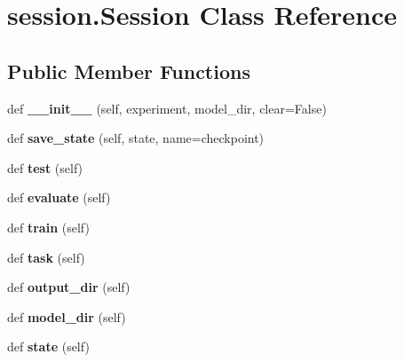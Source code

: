 \hypertarget{classsession_1_1Session}{}\section{session.\+Session Class Reference}
\label{classsession_1_1Session}
\subsection*{Public Member Functions}
\begin{DoxyCompactItemize}
\item 
def {\bfseries \+\_\+\+\_\+init\+\_\+\+\_\+} (self, experiment, model\+\_\+dir, clear=False)\hypertarget{classsession_1_1Session_a79087a984df38aaaed52c9cee494c388}{}\label{classsession_1_1Session_a79087a984df38aaaed52c9cee494c388}

\item 
def {\bfseries save\+\_\+state} (self, state, name=\textquotesingle{}checkpoint\textquotesingle{})\hypertarget{classsession_1_1Session_abafdc85b828e5a4494a88ea434a025f2}{}\label{classsession_1_1Session_abafdc85b828e5a4494a88ea434a025f2}

\item 
def {\bfseries test} (self)\hypertarget{classsession_1_1Session_a3ef92529bd7fc0fef4cb0fd1c83a4672}{}\label{classsession_1_1Session_a3ef92529bd7fc0fef4cb0fd1c83a4672}

\item 
def {\bfseries evaluate} (self)\hypertarget{classsession_1_1Session_a8078541c3b0abd31023b219869556066}{}\label{classsession_1_1Session_a8078541c3b0abd31023b219869556066}

\item 
def {\bfseries train} (self)\hypertarget{classsession_1_1Session_a6cbb164424cf705c4d0a86fd543310c9}{}\label{classsession_1_1Session_a6cbb164424cf705c4d0a86fd543310c9}

\item 
def {\bfseries task} (self)\hypertarget{classsession_1_1Session_aca12e663d21e88ebabf095ffe079f0a1}{}\label{classsession_1_1Session_aca12e663d21e88ebabf095ffe079f0a1}

\item 
def {\bfseries output\+\_\+dir} (self)\hypertarget{classsession_1_1Session_a9310df9e8c31a4c7fd3aef3625a16b86}{}\label{classsession_1_1Session_a9310df9e8c31a4c7fd3aef3625a16b86}

\item 
def {\bfseries model\+\_\+dir} (self)\hypertarget{classsession_1_1Session_a2ae79f3bc6be977afe8f64fd36368154}{}\label{classsession_1_1Session_a2ae79f3bc6be977afe8f64fd36368154}

\item 
def {\bfseries state} (self)\hypertarget{classsession_1_1Session_ac52a44029bcbb9e1887c1bc1c2317cc1}{}\label{classsession_1_1Session_ac52a44029bcbb9e1887c1bc1c2317cc1}

\end{DoxyCompactItemize}
